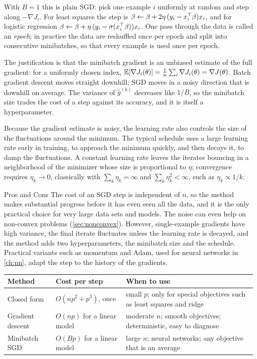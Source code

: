 With $B=1$ this is plain SGD: pick one example $i$ uniformly at random and step along $-\nabla J_i$. For least squares the step is $\beta\gets\beta+2\eta\,(y_i-x_i^{\top}\beta)x_i$, and for logistic regression $\beta\gets\beta+\eta\,(y_i-\sigma(x_i^{\top}\beta))x_i$. One pass through the data is called an \emph{epoch}; in practice the data are reshuffled once per epoch and split into consecutive minibatches, so that every example is used once per epoch.

The justification is that the minibatch gradient is an unbiased estimate of the full gradient: for a uniformly chosen index, $\mathbb{E}[\nabla J_i(\theta)]=\frac1n\sum_i\nabla J_i(\theta)=\nabla J(\theta)$. Batch gradient descent moves straight downhill; SGD moves in a noisy direction that is downhill on average. The variance of $\hat g^{(k)}$ decreases like $1/B$, so the minibatch size trades the cost of a step against its accuracy, and it is itself a hyperparameter.

Because the gradient estimate is noisy, the learning rate also controls the size of the fluctuations around the minimum. The typical schedule uses a large learning rate early in training, to approach the minimum quickly, and then decays it, to damp the fluctuations. A constant learning rate leaves the iterates bouncing in a neighborhood of the minimizer whose size is proportional to $\eta$; convergence requires $\eta_k\to0$, classically with $\sum_k\eta_k=\infty$ and $\sum_k\eta_k^2<\infty$, such as $\eta_k\propto1/k$.

\begin{notebox}{Pros and Cons}
The cost of an SGD step is independent of $n$, so the method makes substantial progress before it has even seen all the data, and it is the only practical choice for very large data sets and models. The noise can even help on non-convex problems (\cref{sec:nonconvex}). However, single-example gradients have high variance, the final iterate fluctuates unless the learning rate is decayed, and the method adds two hyperparameters, the minibatch size and the schedule. Practical variants such as momentum and Adam, used for neural networks in \cref{ch:nn}, adapt the step to the history of the gradients.
\end{notebox}

\begin{center}
\small
\begin{tabularx}{\textwidth}{@{}l>{\raggedright\arraybackslash}X>{\raggedright\arraybackslash}X@{}}
\toprule
Method & Cost per step & When to use \\
\midrule
Closed form & $O(np^2+p^3)$, once & small $p$; only for special objectives such as least squares and ridge \\
Gradient descent & $O(np)$ for a linear model & moderate $n$; smooth objectives; deterministic, easy to diagnose \\
Minibatch SGD & $O(Bp)$ for a linear model & large $n$; neural networks; any objective that is an average \\
\bottomrule
\end{tabularx}
\end{center}

